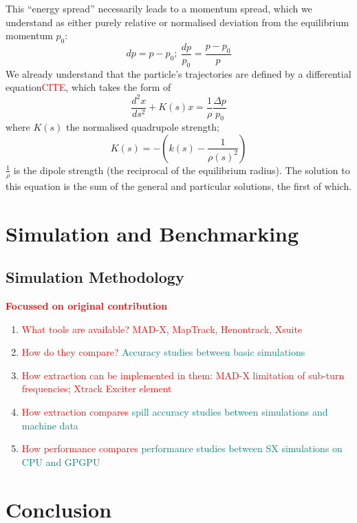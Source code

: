 \documentclass[11pt]{report}
\newcommand\todo[1]{\textcolor{red}{#1}}
\begin{document}
This ``energy spread'' necessarily leads to a momentum spread, which we understand as either purely relative or normalised deviation from the equilibrium momentum $p_0$:
\begin{equation}
 dp=p-p_0;\ \frac{dp}{p_0}=\frac{p-p_0}{p}
\end{equation}
We already understand that the particle's trajectories are defined by a differential equation\textcolor{red}{CITE}, which takes the form of
\begin{equation}
\frac{d^2x}{ds^2}+K(s)x=\frac 1\rho\frac{\Delta p}{p_0}
\end{equation} where $K(s)$ the normalised quadrupole strength;
\begin{equation}
K(s)=-\left(k(s)-\frac 1{\rho(s)^2}\right)
\end{equation}
 $\frac 1\rho$ is the dipole strength (the reciprocal of the equilibrium radius). The solution to this equation is the sum of the general and particular solutions, the first of which.

\chapter{Simulation and Benchmarking}
\section{Simulation Methodology}
\todo{\textbf{Focussed on original contribution}}
\begin{enumerate}
    \item \todo{What tools are available? MAD-X, MapTrack, Henontrack, Xsuite}
    \item \todo{How do they compare?} \textcolor{teal}{Accuracy studies between basic simulations}
    \item \todo{How extraction can be implemented in them: MAD-X limitation of sub-turn frequencies; Xtrack Exciter element}
    \item \todo{How extraction compares} \textcolor{teal}{spill accuracy studies between simulations and machine data}
    \item \todo{How performance compares} \textcolor{teal}{performance studies between SX simulations on CPU and GPGPU}
\end{enumerate}

\chapter{Conclusion}
\end{document}
